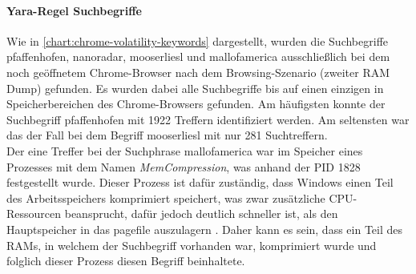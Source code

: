 \paragraph*{Yara-Regel \glqq{}Suchbegriffe\grqq{}}\label{chap:ergebnisse-chrome-uncommon-volatility-suchbegriffe}

Wie in \autoref{chart:chrome-volatility-keywords} dargestellt, wurden die Suchbegriffe \glqq{}pfaffenhofen\grqq{}, \glqq{}nanoradar\grqq{}, \glqq{}mooserliesl\grqq{} und \glqq{}mallofamerica\grqq{} ausschließlich bei dem noch geöffnetem Chrome-Browser nach dem Browsing-Szenario (zweiter RAM Dump) gefunden. Es wurden dabei alle Suchbegriffe bis auf einen einzigen in Speicherbereichen des Chrome-Browsers gefunden. Am häufigsten konnte der Suchbegriff \glqq{}pfaffenhofen\grqq{} mit 1922 Treffern identifiziert werden. Am seltensten war das der Fall bei dem Begriff \glqq{}mooserliesl\grqq{} mit nur 281 Suchtreffern. \\
Der eine Treffer bei der Suchphrase \glqq{}mallofamerica\grqq{} war im Speicher eines Prozesses mit dem Namen \textit{MemCompression}, was anhand der PID 1828 festgestellt wurde. Dieser Prozess ist dafür zuständig, dass Windows einen Teil des Arbeitsspeichers komprimiert speichert, was zwar zusätzliche CPU-Ressourcen beansprucht, dafür jedoch deutlich schneller ist, als den Hauptspeicher in das pagefile auszulagern \cite{MemCompressionWebsite}. Daher kann es sein, dass ein Teil des RAMs, in welchem der Suchbegriff vorhanden war, komprimiert wurde und folglich dieser Prozess diesen Begriff beinhaltete.

